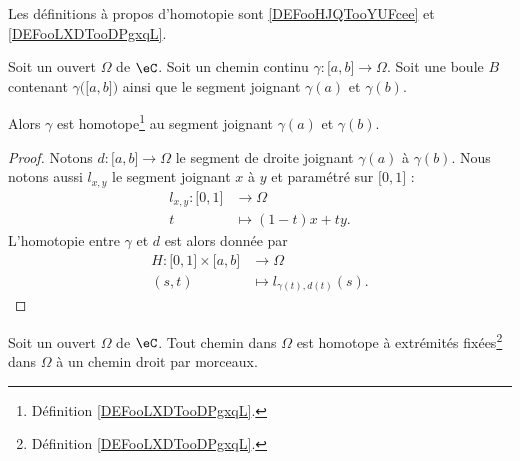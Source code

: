 Les définitions à propos d'homotopie sont \ref{DEFooHJQTooYUFcee} et \ref{DEFooLXDTooDPgxqL}.



\begin{lemma}        \label{LEMooTDTAooCRSYzI}
	Soit un ouvert \( \Omega\) de \( \eC\). Soit un chemin continu \(\gamma\colon \mathopen[ a , b \mathclose]\to \Omega \). Soit une boule \( B\) contenant \( \gamma\big( \mathopen[ a ,b \mathclose] \big)\) ainsi que le segment joignant \( \gamma(a)\) et \( \gamma(b)\).

	Alors \( \gamma\) est homotope\footnote{Définition \ref{DEFooLXDTooDPgxqL}.} au segment joignant \( \gamma(a)\) et \( \gamma(b)\).
\end{lemma}

\begin{proof}
	Notons \( d\colon \mathopen[ a , b \mathclose]\to \Omega\) le segment de droite joignant \( \gamma(a)\) à \( \gamma(b)\). Nous notons aussi \( l_{x,y}\) le segment joignant \( x\) à \( y\) et paramétré sur \( \mathopen[ 0 , 1 \mathclose]\) :
	\begin{equation}
		\begin{aligned}
			l_{x,y}\colon \mathopen[ 0 , 1 \mathclose] & \to \Omega         \\
			t                                          & \mapsto (1-t)x+ty.
		\end{aligned}
	\end{equation}
	L'homotopie entre \( \gamma\) et \( d\) est alors donnée par
	\begin{equation}
		\begin{aligned}
			H\colon \mathopen[ 0 , 1 \mathclose]\times \mathopen[ a , b \mathclose] & \to \Omega                     \\
			(s,t)                                                                   & \mapsto l_{\gamma(t),d(t)}(s).
		\end{aligned}
	\end{equation}
\end{proof}


\begin{lemma}     \label{LEMooQNFCooWorCxN}
	Soit un ouvert \( \Omega\) de \( \eC\). Tout chemin dans \( \Omega\) est homotope à extrémités fixées\footnote{Définition \ref{DEFooLXDTooDPgxqL}.}  dans \( \Omega\) à un chemin droit par morceaux.
\end{lemma}

